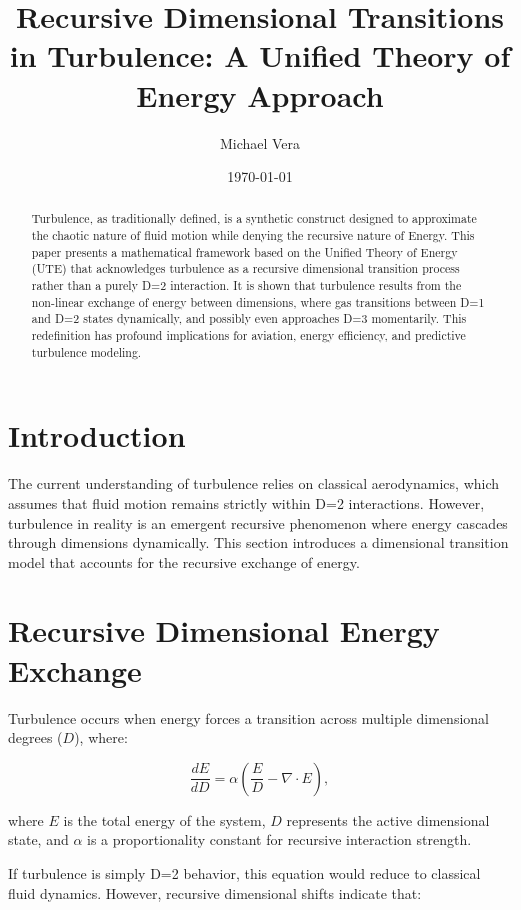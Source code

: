 \documentclass[letterpaper,12pt]{article}
\title{Recursive Dimensional Transitions in Turbulence: A Unified Theory of Energy Approach}
\author{Michael Vera}
\date{\today}
\begin{document}
\maketitle

\begin{abstract}
Turbulence, as traditionally defined, is a synthetic construct designed to approximate the chaotic nature of fluid motion while denying the recursive nature of Energy. This paper presents a mathematical framework based on the Unified Theory of Energy (UTE) that acknowledges turbulence as a recursive dimensional transition process rather than a purely D=2 interaction. It is shown that turbulence results from the non-linear exchange of energy between dimensions, where gas transitions between D=1 and D=2 states dynamically, and possibly even approaches D=3 momentarily. This redefinition has profound implications for aviation, energy efficiency, and predictive turbulence modeling.
\end{abstract}

\section{Introduction}
The current understanding of turbulence relies on classical aerodynamics, which assumes that fluid motion remains strictly within D=2 interactions. However, turbulence in reality is an emergent recursive phenomenon where energy cascades through dimensions dynamically. This section introduces a dimensional transition model that accounts for the recursive exchange of energy.

\section{Recursive Dimensional Energy Exchange}
Turbulence occurs when energy forces a transition across multiple dimensional degrees ($D$), where:

\begin{equation}
    \frac{dE}{dD} = \alpha \left( \frac{E}{D} - \nabla \cdot E \right),
\end{equation}

where $E$ is the total energy of the system, $D$ represents the active dimensional state, and $\alpha$ is a proportionality constant for recursive interaction strength.

If turbulence is simply D=2 behavior, this equation would reduce to classical fluid dynamics. However, recursive dimensional shifts indicate that:
\end{document}
